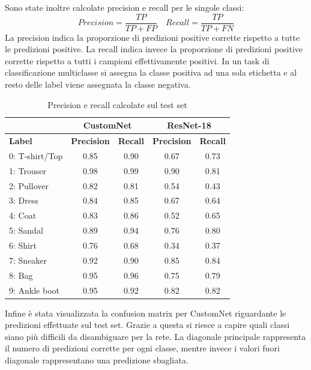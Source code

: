 Sono state inoltre calcolate precision e recall per le singole classi:
$$Precision = \frac{TP}{TP+FP} \quad Recall=\frac{TP}{TP+FN}$$
La precision indica la proporzione di predizioni positive corrette rispetto a tutte le predizioni positive. La recall indica invece la proporzione di predizioni positive corrette rispetto a tutti i campioni effettivamente positivi. In un task di classificazione multiclasse si assegna la classe positiva ad una sola etichetta e al resto delle label viene assegnata la classe negativa.
\begin{table}[!hbt]
\centering
\begin{adjustbox}{width=\columnwidth}
\begin{tabular}{|l|c|c|c|c|}
\hline        & \multicolumn{2}{c|}{\textbf{CustomNet}}& \multicolumn{2}{c|}{\textbf{ResNet-18}}\\
\hline \textbf{Label} &\textbf{Precision} &\textbf{Recall} &\textbf{Precision} &\textbf{Recall} \\
\hline 0: T-shirt/Top & 0.85& 0.90 & 0.67&0.73\\
\hline 1: Trouser     & 0.98& 0.99 & 0.90&0.81\\
\hline 2: Pullover    & 0.82& 0.81 & 0.54&0.43\\
\hline 3: Dress       & 0.84& 0.85 & 0.67&0.64\\
\hline 4: Coat        & 0.83& 0.86 & 0.52&0.65\\
\hline 5: Sandal      & 0.89& 0.94 & 0.76&0.80\\
\hline 6: Shirt       & 0.76& 0.68 & 0.34&0.37\\
\hline 7: Sneaker     & 0.92& 0.90 & 0.85&0.84\\
\hline 8: Bag         & 0.95& 0.96 & 0.75&0.79\\
\hline 9: Ankle boot  & 0.95& 0.92 & 0.82&0.82\\
\hline
\end{tabular}
\end{adjustbox}
\label{tab1:precision-recall}
\caption{Precision e recall calcolate sul test set}
\end{table}\par
Infine è stata visualizzata la confusion matrix per CustomNet riguardante le predizioni effettuate sul test set. Grazie a questa si riesce a capire quali classi siano più difficili da disambiguare per la rete. La diagonale principale rappresenta il numero di predizioni corrette per ogni classe, mentre invece i valori fuori diagonale rappresentano una predizione sbagliata.
